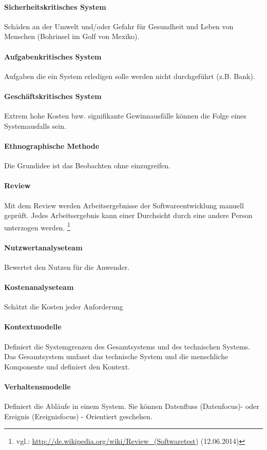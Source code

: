 \paragraph{Sicherheitskritisches System}
Schäden an der Umwelt und/oder Gefahr für Gesundheit und Leben von Menschen (Bohrinsel im Golf von Mexiko).
\paragraph{Aufgabenkritisches System}
Aufgaben die ein System erledigen solle werden nicht durchgeführt (z.B. Bank).
\paragraph{Geschäftskritisches System}
Extrem hohe Kosten bzw. signifikante Gewinnausfälle können die Folge eines Systemausfalls sein.
\paragraph{Ethnographische Methode}
Die Grundidee ist das Beobachten ohne einzugreifen.
\paragraph{Review}
Mit dem Review werden Arbeitsergebnisse der Softwareentwicklung manuell geprüft. Jedes Arbeitsergebnis kann einer Durchsicht durch eine andere Person unterzogen werden. \footnote{vgl.: \url{http://de.wikipedia.org/wiki/Review_(Softwaretest)} (12.06.2014)}
\paragraph{Nutzwertanalyseteam}
Bewertet den Nutzen für die Anwender.
\paragraph{Kostenanalyseteam}
Schätzt die Kosten jeder Anforderung
\paragraph{Kontextmodelle}
Definiert die Systemgrenzen des Gesamtsystems und des technischen Systems. Das Gesamtsystem umfasst das technische System und die menschliche Komponente und definiert den Kontext.
\paragraph{Verhaltensmodelle}
Definiert die Abläufe in einem System. Sie können Datenfluss (Datenfocus)- oder Ereignis (Ereignisfocus) - Orientiert geschehen.
